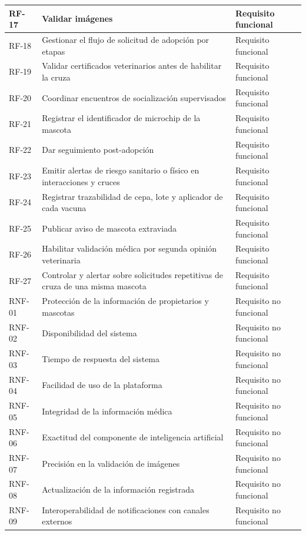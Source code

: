 \documentclass[journal,onecolumn]{IEEEtran}
\begin{document}
\begin{longtable}{@{}p{2.2cm} p{7.5cm} p{3.5cm}@{}}
		\hline
		RF-17 & Validar imágenes & Requisito funcional \\
		\hline
		RF-18 & Gestionar el flujo de solicitud de adopción por etapas & Requisito funcional \\
		\hline
		RF-19 & Validar certificados veterinarios antes de habilitar la cruza & Requisito funcional \\
		\hline
		RF-20 & Coordinar encuentros de socialización supervisados & Requisito funcional \\
		\hline
		RF-21 & Registrar el identificador de microchip de la mascota & Requisito funcional \\
		\hline
		RF-22 & Dar seguimiento post-adopción & Requisito funcional \\
		\hline
		RF-23 & Emitir alertas de riesgo sanitario o físico en interacciones y cruces & Requisito funcional \\
		\hline
		RF-24 & Registrar trazabilidad de cepa, lote y aplicador de cada vacuna & Requisito funcional \\
		\hline
		RF-25 & Publicar aviso de mascota extraviada & Requisito funcional \\
		\hline
		RF-26 & Habilitar validación médica por segunda opinión veterinaria & Requisito funcional \\
		\hline
		RF-27 & Controlar y alertar sobre solicitudes repetitivas de cruza de una misma mascota & Requisito funcional \\
		\hline
		RNF-01 & Protección de la información de propietarios y mascotas & Requisito no funcional \\
		\hline
		RNF-02 & Disponibilidad del sistema & Requisito no funcional \\
		\hline
		RNF-03 & Tiempo de respuesta del sistema & Requisito no funcional \\
		\hline
		RNF-04 & Facilidad de uso de la plataforma & Requisito no funcional \\
		\hline
		RNF-05 & Integridad de la información médica & Requisito no funcional \\
		\hline
		RNF-06 & Exactitud del componente de inteligencia artificial & Requisito no funcional \\
		\hline
		RNF-07 & Precisión en la validación de imágenes & Requisito no funcional \\
		\hline
		RNF-08 & Actualización de la información registrada & Requisito no funcional \\
		\hline
		RNF-09 & Interoperabilidad de notificaciones con canales externos & Requisito no funcional \\

\end{longtable}
\end{document}
